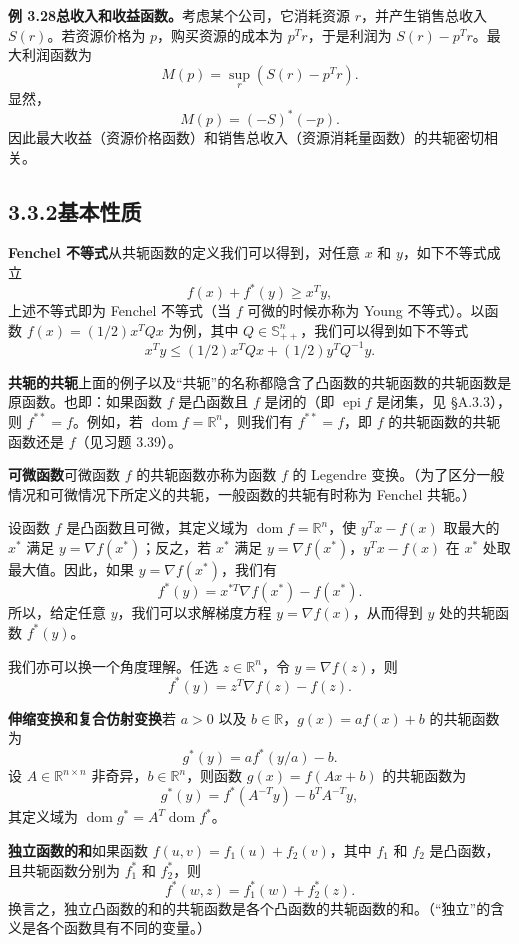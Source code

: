 \documentclass[UTF8,12pt,a4paper,fontset=fandol]{ctexart}
\DeclareMathOperator{\dom}{dom}
\DeclareMathOperator{\epi}{epi}
\begin{document}
\noindent\textbf{例 3.28\quad 总收入和收益函数。}\quad 考虑某个公司，它消耗资源 $r$，并产生销售总收入 $S(r)$。若资源价格为 $p$，购买资源的成本为 $p^Tr$，于是利润为 $S(r)-p^Tr$。最大利润函数为
\[
M(p)=\sup_r\left(S(r)-p^Tr\right).
\]
显然，
\[
M(p)=(-S)^*(-p).
\]
因此最大收益（资源价格函数）和销售总收入（资源消耗量函数）的共轭密切相关。

\subsection*{3.3.2\quad 基本性质}

\noindent\textbf{Fenchel 不等式}\quad 从共轭函数的定义我们可以得到，对任意 $x$ 和 $y$，如下不等式成立
\[
f(x)+f^*(y)\geq x^Ty,
\]
上述不等式即为 Fenchel 不等式（当 $f$ 可微的时候亦称为 Young 不等式）。以函数 $f(x)=(1/2)x^TQx$ 为例，其中 $Q\in\mathbb{S}_{++}^n$，我们可以得到如下不等式
\[
x^Ty\leq(1/2)x^TQx+(1/2)y^TQ^{-1}y.
\]

\noindent\textbf{共轭的共轭}\quad 上面的例子以及“共轭”的名称都隐含了凸函数的共轭函数的共轭函数是原函数。也即：如果函数 $f$ 是凸函数且 $f$ 是闭的（即 $\epi f$ 是闭集，见 \S A.3.3），则 $f^{**}=f$。例如，若 $\dom f=\mathbb{R}^n$，则我们有 $f^{**}=f$，即 $f$ 的共轭函数的共轭函数还是 $f$（见习题 3.39）。

\noindent\textbf{可微函数}\quad 可微函数 $f$ 的共轭函数亦称为函数 $f$ 的 Legendre 变换。（为了区分一般情况和可微情况下所定义的共轭，一般函数的共轭有时称为 Fenchel 共轭。）

设函数 $f$ 是凸函数且可微，其定义域为 $\dom f=\mathbb{R}^n$，使 $y^Tx-f(x)$ 取最大的 $x^*$ 满足 $y=\nabla f(x^*)$；反之，若 $x^*$ 满足 $y=\nabla f(x^*)$，$y^Tx-f(x)$ 在 $x^*$ 处取最大值。因此，如果 $y=\nabla f(x^*)$，我们有
\[
f^*(y)=x^{*T}\nabla f(x^*)-f(x^*).
\]
所以，给定任意 $y$，我们可以求解梯度方程 $y=\nabla f(x)$，从而得到 $y$ 处的共轭函数 $f^*(y)$。

我们亦可以换一个角度理解。任选 $z\in\mathbb{R}^n$，令 $y=\nabla f(z)$，则
\[
f^*(y)=z^T\nabla f(z)-f(z).
\]

\noindent\textbf{伸缩变换和复合仿射变换}\quad 若 $a>0$ 以及 $b\in\mathbb{R}$，$g(x)=af(x)+b$ 的共轭函数为
\[
g^*(y)=af^*(y/a)-b.
\]
设 $A\in\mathbb{R}^{n\times n}$ 非奇异，$b\in\mathbb{R}^n$，则函数 $g(x)=f(Ax+b)$ 的共轭函数为
\[
g^*(y)=f^*(A^{-T}y)-b^TA^{-T}y,
\]
其定义域为 $\dom g^*=A^T\dom f^*$。

\noindent\textbf{独立函数的和}\quad 如果函数 $f(u,v)=f_1(u)+f_2(v)$，其中 $f_1$ 和 $f_2$ 是凸函数，且共轭函数分别为 $f_1^*$ 和 $f_2^*$，则
\[
f^*(w,z)=f_1^*(w)+f_2^*(z).
\]
换言之，独立凸函数的和的共轭函数是各个凸函数的共轭函数的和。（“独立”的含义是各个函数具有不同的变量。）
\end{document}
